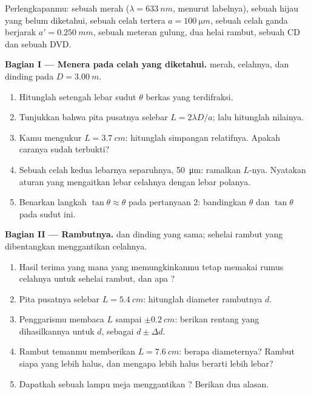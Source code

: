 \begin{problem}
\label{pb:g12:light-as-wave:1}
Perlengkapanmu: sebuah  merah ($\lambda = \qty{633}{nm}$, menurut
labelnya), sebuah  hijau yang  belum
diketahui, sebuah celah tertera $a = \qty{100}{\micro m}$, sebuah celah
ganda berjarak $a' =
\qty{0.250}{mm}$, sebuah meteran gulung, dua helai
rambut, sebuah CD dan sebuah DVD.

\medskip
\noindent\textbf{Bagian I --- Menera pada celah yang diketahui.}
 merah, celahnya, dan dinding pada $D = \qty{3.00}{m}$.
\begin{enumerate}
  \item Hitunglah setengah lebar sudut $\theta$ berkas yang
        terdifraksi.
  \item Tunjukkan bahwa pita pusatnya selebar $L = 2\lambda D/a$; lalu
        hitunglah nilainya.
  \item Kamu mengukur $L = \qty{3.7}{cm}$: hitunglah simpangan
        relatifnya. Apakah caranya sudah terbukti?
  \item Sebuah celah kedua lebarnya separuhnya, \qty{50}{\micro m}:
        ramalkan $L$-nya. Nyatakan aturan yang mengaitkan lebar celahnya
        dengan lebar polanya.
  \item Benarkan langkah $\tan\theta \approx \theta$ pada pertanyaan 2:
        bandingkan $\theta$ dan $\tan\theta$ pada sudut ini.
\end{enumerate}

\medskip
\noindent\textbf{Bagian II --- Rambutnya.}  dan dinding yang sama;
sehelai rambut yang dibentangkan menggantikan celahnya.
\begin{enumerate}[resume]
  \item Hasil terima yang mana yang memungkinkanmu tetap memakai rumus
        celahnya untuk sehelai rambut, dan apa ?
  \item Pita pusatnya selebar $L = \qty{5.4}{cm}$: hitunglah diameter
        rambutnya $d$.
  \item Penggarismu membaca $L$ sampai $\pm\qty{0.2}{cm}$: berikan
        rentang yang dihasilkannya untuk $d$, sebagai $d \pm \Delta d$.
  \item Rambut temanmu memberikan $L = \qty{7.6}{cm}$: berapa
        diameternya? Rambut siapa yang lebih halus, dan mengapa lebih
        halus berarti lebih lebar?
  \item Dapatkah sebuah lampu meja menggantikan ? Berikan dua
        alasan.
\end{enumerate}


\end{problem}
